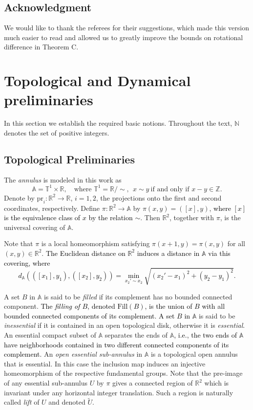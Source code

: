 \documentclass[12pt,a4paper]{amsart}
\theoremstyle{definition}
\theoremstyle{remark}
\newcommand{\T}{\mathbb{T}}
\newcommand{\R}{\mathbb{R}}
\newcommand{\Z}{\mathbb{Z}}
\newcommand{\N}{\mathbb{N}}
\newcommand{\A}{\mathbb{A}}
\begin{document}
\subsection{Acknowledgment}
We would like to thank the referees for their suggestions, which made this version much easier to read and allowed us to greatly improve the bounds on rotational difference in Theorem C.  



%
\section{Topological and Dynamical preliminaries}\label{s.prelim}

In this section we establish the required basic notions. Throughout the text, $\N$ denotes the set of positive integers.

\subsection{Topological Preliminaries}

The \emph{annulus} is modeled in this work as
\[
\A = \T^1 \times \R, \quad \text{where } \T^1 = \R / \sim,\ \ x \sim y \ \text{if and only if } x - y \in \Z.
\]
Denote by $\mathrm{pr}_i : \R^2 \to \R$, $i=1,2$, the projections onto the first and second coordinates, respectively. Define $\pi : \R^2 \to \A$ by $\pi(x,y) = ([x],y)$, \textcolor{black}{ where $[x]$ is the equivalence class of $x$ by the relation $\sim$}. 
Then $\R^2$, together with $\pi$, is the universal covering of $\A$.

Note that $\pi$ is a local homeomorphism satisfying $\pi(x+1,y) = \pi(x,y)$ for all $(x,y) \in \R^2$. \textcolor{black}{The Euclidean distance on $\R^2$ induces a distance in $\A$ via this covering, where
$$d_{\A}(([x_1],y_1), ([x_2],y_2))=\min_{x_2'\sim x_2}\sqrt{(x_2'-x_1)^2+(y_2-y_1)^2}.$$}

A set $B$ in $\A$ is said to be \emph{filled} if its complement has no bounded connected component. \textcolor{black}{The \emph{filling of $B$}, denoted $\mathrm{Fill}(B)$, is the union of $B$ with all bounded connected components of its complement. A set $B$ in $\A$ } is said to be \emph{inessential} if it is contained in an open topological disk, otherwise it is \emph{essential}. An essential compact subset of $\A$ separates the ends of $\A$\textcolor{black}{, i.e., the two ends of $\A$ have neighborhoods contained in two different connected components of its complement.} An \emph{open essential sub-annulus} in $\A$ is a topological open annulus that is essential. In this case the inclusion map induces an injective homeomorphism of the respective fundamental groups.
Note that the pre-image of any essential sub-annulus $U$ by $\pi$ gives a connected region of $\R^2$ which is invariant under any horizontal integer translation. Such a region is naturally
called \emph{lift} of $U$ and denoted $\tilde{U}$.
\end{document}
